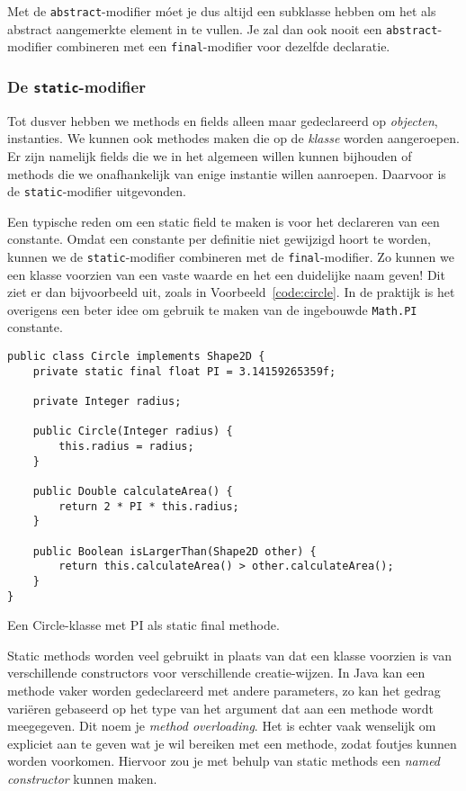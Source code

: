 Met de \texttt{abstract}-modifier móet je dus altijd een subklasse hebben
om het als abstract aangemerkte element in te vullen.
Je zal dan ook nooit een \texttt{abstract}-modifier combineren met 
een \texttt{final}-modifier voor dezelfde declaratie.

\subsubsection{De \texttt{static}-modifier}
Tot dusver hebben we methods en fields alleen maar gedeclareerd op 
\emph{objecten}, instanties.
We kunnen ook methodes maken die op de \emph{klasse} worden aangeroepen.
Er zijn namelijk fields die we in het algemeen willen kunnen bijhouden
of methods die we onafhankelijk van enige instantie willen aanroepen.
Daarvoor is de \texttt{static}-modifier uitgevonden.

Een typische reden om een static field te maken is voor
het declareren van een constante. Omdat een constante per definitie
niet gewijzigd hoort te worden, kunnen we de \texttt{static}-modifier combineren 
met de \texttt{final}-modifier. Zo kunnen we een klasse voorzien van een vaste waarde 
en het een duidelijke naam geven! 
Dit ziet er dan bijvoorbeeld uit, zoals in Voorbeeld~\ref{code:circle}.
In de praktijk is het overigens een beter idee om gebruik te maken van
de ingebouwde \texttt{Math.PI} constante.

\begin{listing}[H]
\begin{verbatim}
public class Circle implements Shape2D {
    private static final float PI = 3.14159265359f;

    private Integer radius;

    public Circle(Integer radius) {
        this.radius = radius;
    }

    public Double calculateArea() {
        return 2 * PI * this.radius;
    }

    public Boolean isLargerThan(Shape2D other) {
        return this.calculateArea() > other.calculateArea();
    }
}
\end{verbatim}
\caption{Een Circle-klasse met PI als static final methode.}
\label{code:circle}
\end{listing}

Static methods worden veel gebruikt in plaats van dat een klasse voorzien is van 
verschillende constructors voor verschillende creatie-wijzen.
In Java kan een methode vaker worden gedeclareerd met andere parameters, zo kan 
het gedrag variëren gebaseerd op het type van het argument dat aan een methode wordt meegegeven.
Dit noem je \textit{method overloading}. Het is echter vaak wenselijk om expliciet 
aan te geven wat je wil bereiken met een methode, zodat foutjes kunnen worden voorkomen.
Hiervoor zou je met behulp van static methods een \textit{named constructor} kunnen maken.

